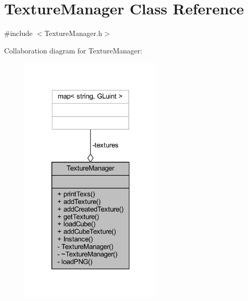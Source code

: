 \section{Texture\+Manager Class Reference}
\label{class_texture_manager}


{\ttfamily \#include $<$Texture\+Manager.\+h$>$}



Collaboration diagram for Texture\+Manager\+:\nopagebreak
\begin{figure}[H]
\begin{center}
\leavevmode
\includegraphics[width=193pt]{d0/d05/class_texture_manager__coll__graph}
\end{center}
\end{figure}
